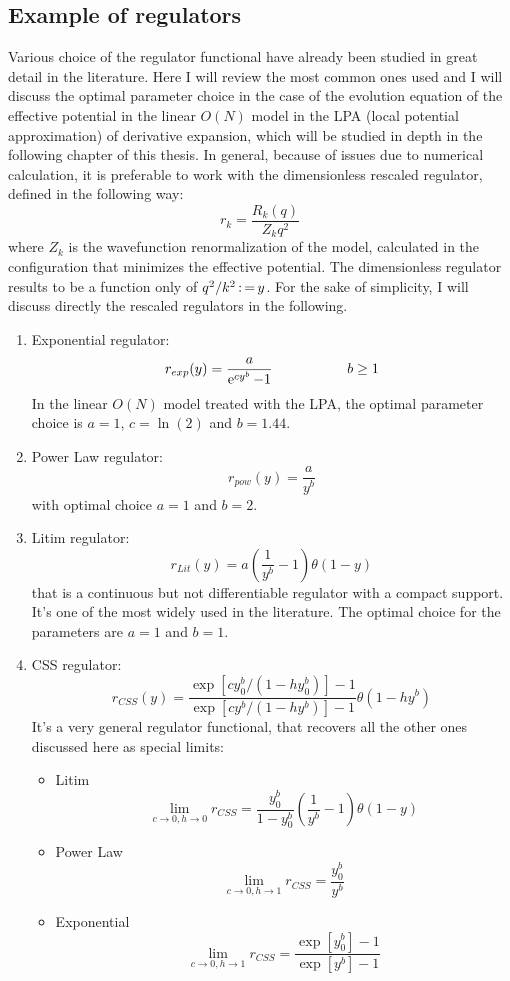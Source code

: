 \subsection{Example of regulators}
Various choice of the regulator functional have already been studied in great detail in the literature.
Here I will review the most common ones used and I will discuss the optimal parameter choice in the case of the evolution equation of the effective potential in 
the linear $O(N)$ model in the LPA (local potential approximation) of derivative expansion, which will be studied in depth in the following chapter of this thesis.
In general, because of issues due to numerical calculation, it is preferable to work with the dimensionless rescaled regulator, defined in the following way:
\begin{equation}
 r_k = \frac{R_k(q)}{Z_kq^2}
\end{equation}
where $Z_k$ is the wavefunction renormalization of the model, calculated in the configuration that minimizes the effective potential.
The dimensionless regulator results to be a function only of $q^2/k^2 \operatorname{:=} y$. For the sake of simplicity, I will discuss directly the rescaled regulators in the following.
\begin{enumerate}
 \item Exponential regulator\cite{powerlaw}:
      $$r_{exp}(y) = \frac{a}{\operatorname{e}^{cy^b} - 1}\ \ \ \ \ \  \ \ \ \ \ \ \ \ \ \ b\geq1$$
      In the linear $O(N)$ model treated with the LPA, the optimal parameter choice is $a = 1$, $c = \ln(2)$ and $b = 1.44$.
 \item Power Law regulator\cite{exp}:
      $$r_{pow}(y) = \frac{a}{y^b}$$
      with optimal choice $a = 1$ and $b = 2$.
 \item Litim regulator\cite{litim}:
      $$r_{Lit} (y) = a\left( \frac{1}{y^b} - 1\right)\theta(1-y)$$
      that is a continuous but not differentiable regulator with a compact support. It's one of the most widely used in the literature.
      The optimal choice for the parameters are $a = 1$ and $b = 1$.
 \item CSS regulator\cite{13}:
      $$r_{CSS}(y) = \frac{\exp[{cy_0^b}/({1 - hy_0^b})] - 1}{\exp[{cy^b}/({1 - hy^b})] - 1}\theta(1-hy^b)$$
      It's a very general regulator functional, that recovers all the other ones discussed here as special limits:
      \begin{itemize}
       \item Litim $$\lim_{c\to 0, h\to0} r_{CSS} = \frac{y_0^b}{1 - y_0^b}\left(\frac{1}{y^b} - 1\right) \theta (1 - y)$$
       \item Power Law       $$\lim_{c\to 0, h\to1} r_{CSS} = \frac{y_0^b}{y^b}$$
       \item Exponential $$\lim_{c\to 0, h\to1} r_{CSS} = \frac{\exp[y_0^b] - 1}{\exp[y^b] - 1}$$
      \end{itemize}
\end{enumerate}



